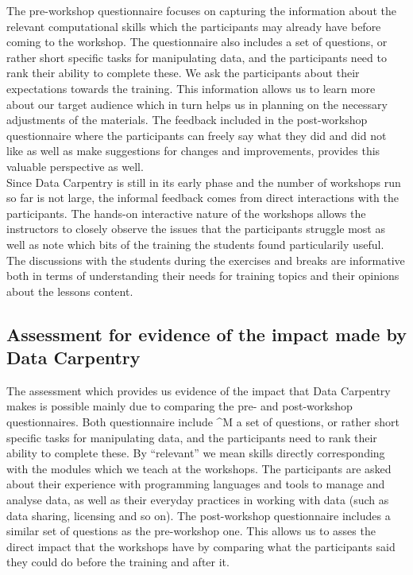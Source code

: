 \documentclass[15]{idcc}
\begin{document}
\begin{itemize}
The pre-workshop questionnaire focuses on capturing the information about the relevant computational skills which the participants may already
have before coming to the workshop. The questionnaire also includes
a set of questions, or rather short specific tasks for manipulating data, and the participants need to rank their ability to complete these.
We ask the participants about their expectations towards the training. This information allows us to learn more about our target audience which
in turn helps us in planning on the necessary adjustments of the materials. The feedback included in the post-workshop questionnaire
where the participants can freely say what they did and did not like as well as  make suggestions for changes and improvements, provides this
valuable perspective as well. \\

Since Data Carpentry is still in its early phase and the number of workshops run so far is not large, the informal feedback comes from direct interactions with the participants.
The hands-on interactive nature of the workshops allows the instructors to closely observe the issues that the participants struggle most as well as note which bits of the training the students
found particularily useful. The discussions with the students during the exercises and breaks are informative both in terms of understanding
their needs for training topics and their opinions about the lessons content.



\subsection{Assessment for evidence of the impact made by Data Carpentry}
The assessment which provides us evidence of the impact that Data Carpentry makes is possible mainly due to comparing the pre- and post-workshop questionnaires.
 Both questionnaire include ^M a set of questions, or rather short specific tasks for manipulating data, and the participants need to rank their ability to complete these.
By ``relevant'' we mean skills directly corresponding with the modules which we teach at the workshops. The
participants are asked about their experience with programming languages and tools to manage and analyse data, as well as their everyday practices
in working with data (such as data sharing, licensing and so on). The post-workshop questionnaire includes a similar set of questions as the
pre-workshop one. This allows us to asses the direct impact that the workshops
have by comparing what the participants said they could do before the training and after it.


\end{itemize}
\end{document}
